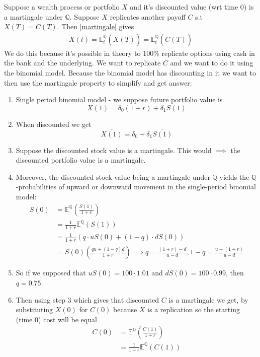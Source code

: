 \documentclass[9pt]{extarticle}
\begin{document}
Suppose a wealth process or portfolio $X$ and it's discounted value (wrt time 0) is a martingale under $\mathbb{Q}$. Suppose 
$X$ replicates another payoff $C$ s.t $X(T) = C(T)$. Then \eqref{martingale} gives 
\begin{align}\label{repli}
  \overline{X(t)} = \mathbb{E}_t^{\mathbb{Q}}\left(\overline{X(T)}\right) = \mathbb{E}_t^{\mathbb{Q}}\left(\overline{C(T)}\right)  
\end{align}
We do this because it's possible in theory to 100\% replicate options using cash in the bank and the underlying. We want to replicate $C$ and we want to do it 
using the binomial model. Because the binomial model has discounting in it we want to then use the martingale property to simplify and get answer:
\begin{enumerate}
  \item Single period binomial model - we suppose future portfolio value is 
  $$X(1) = \delta_0(1+r) + \delta_1 S(1) $$
  \item When discounted we get 
  $$\overline{X(1)} = \delta_0 + \delta_1 \overline{S(1)} $$
  \item Suppose the discounted stock value is a martingale. This would $\implies$ the discounted portfolio value is a martingale.
  \item Moreover, the discounted stock value being a martingale under $\mathbb{Q}$ yields the $\mathbb{Q}$-probabilities of upward or downward movement in the single-period binomial 
  model:
  \begin{align*}
    S(0)  &= \mathbb{E}^{\mathbb{Q}}\left(\frac{S(1)}{1+r}\right) \\ 
         &= \frac{1}{1+r}\mathbb{E}^{\mathbb{Q}}(S(1)) \\ 
         &= \frac{1}{1+r}(q\cdot uS(0) + (1-q)\cdot dS(0)) \\ 
         &= S(0)\left(\frac{qu + (1-q)d}{1+r}\right) \implies q=\frac{(1+r)-d}{u-d}, 1-q = \frac{u-(1+r)}{u-d}
  \end{align*}
  \item So if we supposed that $uS(0) = 100\cdot 1.01$ and $dS(0) = 100\cdot 0.99$, then $q=0.75$.
  \item Then using step 3 which gives that discounted $C$ is a martingale we get, by substituting $X(0)$ for $C(0)$ because 
  $X$ is a replication so the starting (time 0) cost will be equal  
  \begin{align*}
    C(0) &= \mathbb{E}^{\mathbb{Q}}\left(\frac{C(1)}{1+r}\right) \\ 
         &= \frac{1}{1+r}\mathbb{E}^{\mathbb{Q}}(C(1)) \\

\end{align*}
\end{enumerate}
\end{document}
